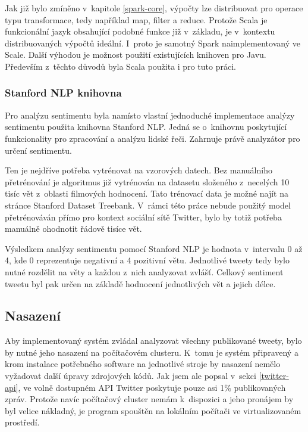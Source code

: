 \documentclass[thesis=B,czech]{FITthesis}[2012/06/26]
\begin{document}
Jak již bylo zmíněno v~kapitole \ref{spark-core}, výpočty lze distribuovat pro operace typu transformace, tedy například map, filter a reduce. Protože Scala je funkcionální jazyk obsahující podobné funkce již v~základu, je v~kontextu distribuovaných výpočtů ideální. I~proto je samotný Spark naimplementovaný ve Scale\cite{spark-scala}. Další výhodou je možnost použití existujících knihoven pro Javu. Především z~těchto důvodů byla Scala použita i pro tuto práci. 

\subsubsection{Stanford NLP knihovna}
\label{stanford-nlp}
	Pro analýzu sentimentu byla namísto vlastní jednoduché implementace analýzy sentimentu použita knihovna Stanford NLP\cite{stanford-nlp-web}. Jedná se o~knihovnu poskytující funkcionality pro zpracování a analýzu lidské řeči. Zahrnuje právě analyzátor pro určení sentimentu. 
	
	Ten je nejdříve potřeba vytrénovat na vzorových datech. Bez manuálního přetrénování je algoritmus již vytrénován na datasetu složeného z~necelých 10 tisíc vět z~oblasti filmových hodnocení. Tato trénovací data je možné najít na stránce Stanford Dataset Treebank\cite{nlp-treebank}. V~rámci této práce nebude použitý model přetrénováván přímo pro kontext sociální sítě Twitter, bylo by totiž potřeba manuálně ohodnotit řádově tisíce vět. 
	
	Výsledkem analýzy sentimentu pomocí Stanford NLP je hodnota v~intervalu 0 až 4, kde 0 reprezentuje negativní a 4 pozitivní větu. Jednotlivé tweety tedy bylo nutné rozdělit na věty a každou z~nich analyzovat zvlášť. Celkový sentiment tweetu byl pak určen na základě hodnocení jednotlivých vět a jejich délce. 

\subsection{Nasazení}
Aby implementovaný systém zvládal analyzovat všechny publikované tweety, bylo by nutné jeho nasazení na počítačovém clusteru. K~tomu je systém připravený a krom instalace potřebného software na jednotlivé stroje by nasazení nemělo vyžadovat další úpravy zdrojových kódů. Jak jsem ale popsal v~sekci \ref{twitter-api}, ve volně dostupném API Twitter poskytuje pouze asi 1\% publikovaných zpráv. Protože navíc počítačový cluster nemám k~dispozici a jeho pronájem by byl velice nákladný, je program spouštěn na lokálním počítači ve virtualizovaném prostředí. 
\end{document}
